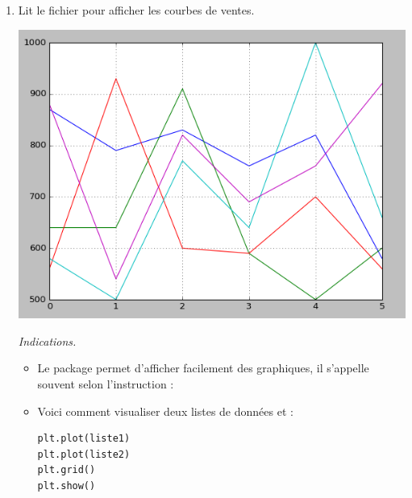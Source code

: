 \documentclass[11pt,class=report,crop=false]{standalone}
\begin{document}
\begin{activite}[]
\begin{enumerate}
  \item Lit le fichier  pour afficher les courbes de ventes.
  \begin{center}
\includegraphics[scale=0.5]{ecran-fichiers-2c}
\end{center}  

  \emph{Indications.} 
  \begin{itemize}
    	\item Le package  permet d'afficher facilement des graphiques, il s'appelle souvent selon l'instruction :\\
   \centerline{}  
   
   \item Voici comment visualiser deux listes de données  et  :
\begin{center}
\begin{minipage}{0.4\textwidth}
\begin{lstlisting}
plt.plot(liste1)
plt.plot(liste2)
plt.grid()
plt.show()
\end{lstlisting}
\end{minipage}
\end{center}


   \end{itemize}
\end{enumerate}   
     
\end{activite}

\end{document}
